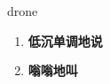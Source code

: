 
\begin{frame}
{\huge drone}
\begin{center}
\begin{enumerate}\Large
  \item \textbf{低沉单调地说}
  \item \textbf{嗡嗡地叫}
\end{enumerate}
\end{center}
\end{frame}
